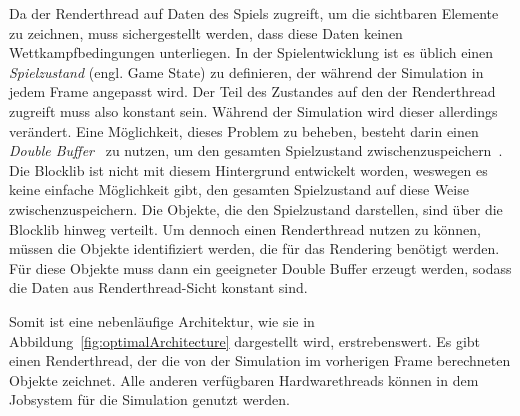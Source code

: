 Da der Renderthread auf Daten des Spiels zugreift, um die sichtbaren Elemente zu zeichnen, muss sichergestellt werden, dass diese Daten keinen Wettkampfbedingungen unterliegen. In der Spielentwicklung ist es üblich einen \emph{Spielzustand} (engl. Game State) zu definieren, der während der Simulation in jedem Frame angepasst wird. Der Teil des Zustandes auf den der Renderthread zugreift muss also konstant sein. Während der Simulation wird dieser allerdings verändert. Eine Möglichkeit, dieses Problem zu beheben, besteht darin einen \emph{Double Buffer}~\cite[S.~143]{Nystrom2015} zu nutzen, um den gesamten Spielzustand zwischenzuspeichern~\cite{Tatarchuk2014}. Die Blocklib ist nicht mit diesem Hintergrund entwickelt worden, weswegen es keine einfache Möglichkeit gibt, den gesamten Spielzustand auf diese Weise zwischenzuspeichern. Die Objekte, die den Spielzustand darstellen, sind über die Blocklib hinweg verteilt. Um dennoch einen Renderthread nutzen zu können, müssen die Objekte identifiziert werden, die für das Rendering benötigt werden. Für diese Objekte muss dann ein geeigneter Double Buffer erzeugt werden, sodass die Daten aus Renderthread-Sicht konstant sind.

Somit ist eine nebenläufige Architektur, wie sie in Abbildung~\ref{fig:optimalArchitecture} dargestellt wird, erstrebenswert. Es gibt einen Renderthread, der die von der Simulation im vorherigen Frame berechneten Objekte zeichnet. Alle anderen verfügbaren Hardwarethreads können in dem Jobsystem für die Simulation genutzt werden.